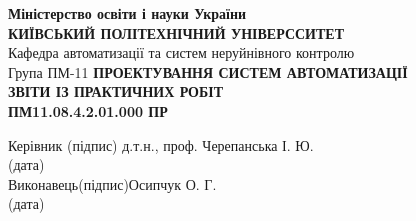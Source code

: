 \documentclass[a4paper]{article}
\begin{document}
\thispagestyle{empty}
\centering
\textbf{Міністерство освіти і науки України}\\
\textbf{КИЇВСЬКИЙ ПОЛІТЕХНІЧНИЙ УНІВЕРССИТЕТ}\\[2cm]
\raggedleft
Кафедра автоматизації та систем неруйнівного контролю\\
Група ПМ-11
\vfill
\centering
\textbf{ПРОЕКТУВАННЯ СИСТЕМ АВТОМАТИЗАЦІЇ}\\[1cm]
\textbf{ЗВІТИ ІЗ ПРАКТИЧНИХ РОБІТ}\\[1cm]
\textbf{ПМ11.08.4.2.01.000 ПР}
\vfill
\begin{flushleft}
    Керівник  \qquad\qquad\quad \hfill\qquad (підпис)\hfill 
    д.т.н., проф. Черепанська І. Ю.\\
    \hfill (дата)\\[2cm]
    Виконавець\hfill (підпис)\hfill Осипчук О. Г.\\
    \hfill (дата)
\end{flushleft}
\vfill
{}
\newpage


\thispagestyle{empty} %
    
    
\end{document}
